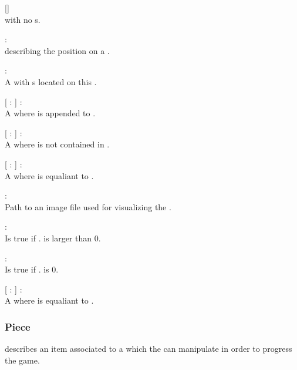 \begin{dlist}
	\item {}[]\\
	 with no s.
	
	\item {} : \\
	 describing the position on a .
	
	\item {} : \\
	A  with s located on this .
	
	\item {}[  :  ] : \\
	A  where  is appended to .
	
	\item {}[  :  ] : \\
	A  where  is not contained in .
	
	\item {}[  :  ] : \\
	A  where  is equaliant to .
	
	\item {} : \\
	Path to an image file used for visualizing the .
	
	\item {} : \\
	Is true if . is larger than 0.
	
	\item {} : \\
	Is true if . is 0.
	
	\item {}[  :  ] : \\
	A  where  is equaliant to .
\end{dlist}

\subsubsection{Piece}
 describes an item associated to a  which the  can manipulate in order to progress the game.

